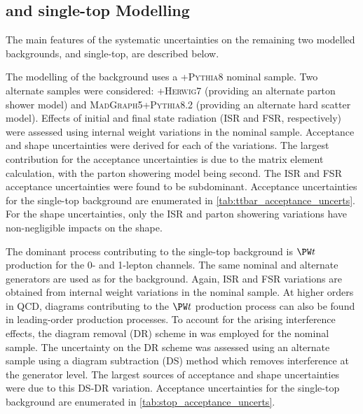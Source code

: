 \subsection{\texorpdfstring{\ttbar}{ttbar} and single-top Modelling}

The main features of the systematic uncertainties on the remaining two modelled backgrounds, \ttbar and single-top, are described below.

The modelling of the \ttbar background uses a \POWHEG{}+\textsc{Pythia8} nominal sample.
Two alternate samples were considered: \POWHEG{}+\textsc{Herwig7} (providing an alternate parton shower model) and \textsc{MadGraph5+Pythia8.2} (providing an alternate hard scatter model).
Effects of initial and final state radiation (ISR and FSR, respectively) were assessed using internal weight variations in the nominal sample.
Acceptance and shape uncertainties were derived for each of the variations.
The largest contribution for the acceptance uncertainties is due to the matrix element calculation, with the parton showering model being second.
The ISR and FSR acceptance uncertainties were found to be subdominant.
Acceptance uncertainties for the single-top background are enumerated in \cref{tab:ttbar_acceptance_uncerts}.
For the shape uncertainties, only the ISR and parton showering variations have non-negligible impacts on the \mJ shape.



The dominant process contributing to the single-top background is $\Wboson t$ production for the 0- and 1-lepton channels.
The same nominal and alternate generators are used as for the \ttbar background.
Again, ISR and FSR variations are obtained from internal weight variations in the nominal sample.
At higher orders in QCD, diagrams contributing to the $\Wboson t$ production process can also be found in leading-order \ttbar
production processes.
To account for the arising interference effects, the diagram removal (DR) scheme in  was employed for the nominal sample.
The uncertainty on the DR scheme was assessed using an alternate sample using a diagram subtraction (DS) method which removes interference at the generator level.
The largest sources of acceptance and shape uncertainties were due to this DS-DR variation.
Acceptance uncertainties for the single-top background are enumerated in \cref{tab:stop_acceptance_uncerts}.




